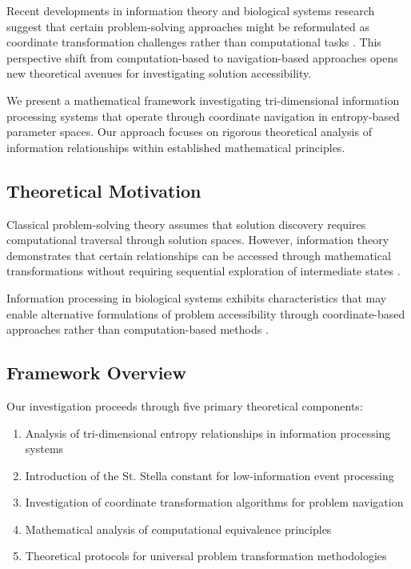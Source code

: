 \documentclass[11pt]{article}
\begin{document}
Recent developments in information theory and biological systems research suggest that certain problem-solving approaches might be reformulated as coordinate transformation challenges rather than computational tasks \cite{cover2006elements, friston2010free}. This perspective shift from computation-based to navigation-based approaches opens new theoretical avenues for investigating solution accessibility.

We present a mathematical framework investigating tri-dimensional information processing systems that operate through coordinate navigation in entropy-based parameter spaces. Our approach focuses on rigorous theoretical analysis of information relationships within established mathematical principles.

\subsection{Theoretical Motivation}

Classical problem-solving theory assumes that solution discovery requires computational traversal through solution spaces. However, information theory demonstrates that certain relationships can be accessed through mathematical transformations without requiring sequential exploration of intermediate states \cite{shannon1948mathematical}.

Information processing in biological systems exhibits characteristics that may enable alternative formulations of problem accessibility through coordinate-based approaches rather than computation-based methods \cite{tononi2008consciousness, friston2010free}.

\subsection{Framework Overview}

Our investigation proceeds through five primary theoretical components:

\begin{enumerate}
\item Analysis of tri-dimensional entropy relationships in information processing systems
\item Introduction of the St. Stella constant for low-information event processing
\item Investigation of coordinate transformation algorithms for problem navigation
\item Mathematical analysis of computational equivalence principles
\item Theoretical protocols for universal problem transformation methodologies
\end{enumerate}
\end{document}
